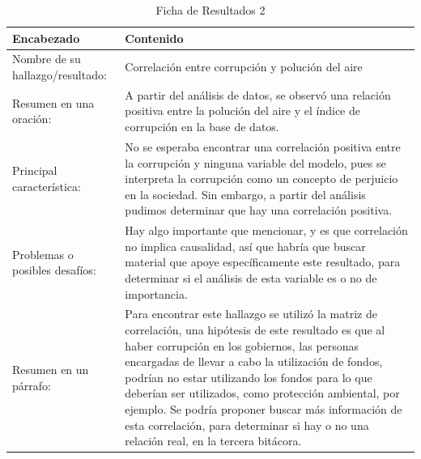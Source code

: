 \begin{table}[H]
    \caption{Ficha de Resultados 2}
    \begin{center}
        \begin{tabular}{  m{3cm} | m{12cm}  }
        \hline\textbf{ Encabezado} & \textbf{Contenido }\\ \hline
        Nombre de su hallazgo/resultado: &  Correlación entre corrupción y polución del aire\\ \hline
        Resumen en una oración: &  A partir del análisis de datos, se observó una relación positiva  entre la polución del aire y el índice de corrupción en la base de datos.
\\ \hline
        Principal característica: &  No se esperaba encontrar una correlación positiva entre la corrupción y ninguna variable del modelo, pues se interpreta la corrupción como un concepto de perjuicio en la sociedad. Sin embargo, a partir del análisis pudimos determinar que hay una correlación positiva.\\ \hline
        Problemas o posibles desafíos: &  Hay algo importante que mencionar, y es que correlación no implica causalidad, así que habría que buscar material que apoye específicamente este resultado, para determinar si el análisis de esta variable es o no de importancia. \\ \hline
        Resumen en un párrafo: & Para encontrar este hallazgo se utilizó la matriz de correlación, una hipótesis de este resultado es que al haber corrupción en los gobiernos, las personas encargadas de llevar a cabo la utilización de fondos, podrían no estar utilizando los fondos para lo que deberían ser utilizados, como protección ambiental, por ejemplo. Se podría proponer buscar más información de esta correlación, para determinar si hay o no una relación real, en la tercera bitácora. \\ \hline
        \end{tabular}
    \end{center}
\end{table}

